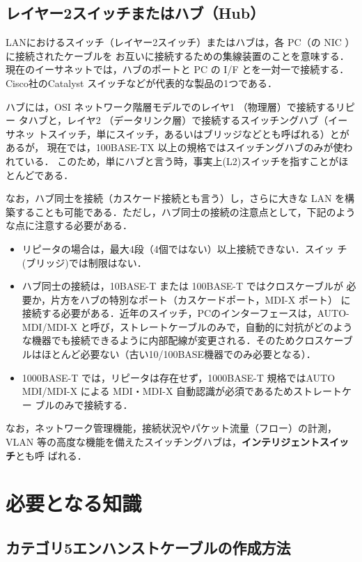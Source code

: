 \subsection*{レイヤー2スイッチまたはハブ（Hub）}
\label{subsec:02:hub}
LANにおけるスイッチ（レイヤー2スイッチ）またはハブは，各 PC（の NIC ）に接続されたケーブルを
お互いに接続するための集線装置のことを意味する．
現在のイーサネットでは，ハブのポートと PC の I/F とを一対一で接続する．
Cisco社のCatalyst スイッチなどが代表的な製品の1つである．

ハブには，OSI ネットワーク階層モデルでのレイヤ1 （物理層）で接続するリピー
タハブと，レイヤ2 （データリンク層）で接続するスイッチングハブ（イーサネッ
トスイッチ，単にスイッチ，あるいはブリッジなどとも呼ばれる）とがあるが，
現在では，100BASE-TX 以上の規格ではスイッチングハブのみが使われている．
このため，単にハブと言う時，事実上(L2)スイッチを指すことがほとんどである．

なお，ハブ同士を接続（カスケード接続とも言う）し，さらに大きな LAN を構
築することも可能である．ただし，ハブ同士の接続の注意点として，下記のよう
な点に注意する必要がある．

\begin{itemize}
 \item リピータの場合は，最大4段（4個ではない）以上接続できない．スイッ
       チ(ブリッジ)では制限はない．
 \item ハブ同士の接続は，10BASE-T または 100BASE-T ではクロスケーブルが
       必要か，片方をハブの特別なポート（カスケードポート，MDI-X ポート）
       に接続する必要がある．近年のスイッチ，PCのインターフェースは，AUTO-MDI/MDI-X と呼び，ストレートケーブルのみで，自動的に対抗がどのような機器でも接続できるように内部配線が変更される．そのためクロスケーブルはほとんど必要ない（古い10/100BASE機器でのみ必要となる）．
 \item 1000BASE-T では，リピータは存在せず，1000BASE-T 規格ではAUTO
       MDI/MDI-X による MDI・MDI-X 自動認識が必須であるためストレートケー
       ブルのみで接続する．
\end{itemize}

なお，ネットワーク管理機能，接続状況やパケット流量（フロー）の計測，VLAN
等の高度な機能を備えたスイッチングハブは，\textbf{インテリジェントスイッチ}とも呼
ばれる．

\section{必要となる知識}
\subsection*{カテゴリ5エンハンストケーブルの作成方法}
